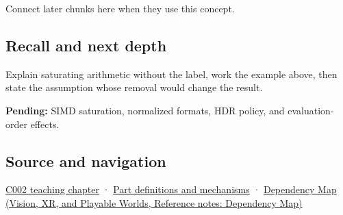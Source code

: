 Connect later chunks here when they use this concept.

\subsection{Recall and next depth}\label{appendix-3999c6209649-recall-and-next-depth}

Explain saturating arithmetic without the label, work the example above, then state the assumption whose removal would change the result.

\textbf{Pending:} SIMD saturation, normalized formats, HDR policy, and evaluation-order effects.

\subsection{Source and navigation}\label{appendix-3999c6209649-source-and-navigation}

\hyperref[01-foundations-i-ch001-arithmetic-becomes-a-policy]{C002 teaching chapter} · \hyperref[appendix-fd090d982a15]{Part definitions and mechanisms} · \href{../07-Vision-XR-and-Playable-Worlds/main.pdf\#nameddest=appendix-4ad47bdd269a}{Dependency Map (Vision, XR, and Playable Worlds, Reference notes: Dependency Map)}

